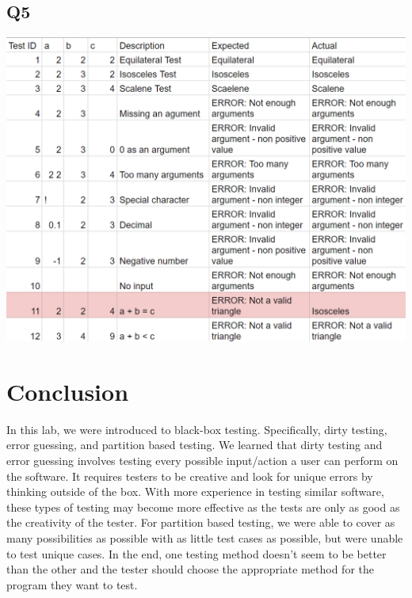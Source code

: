 \documentclass[12pt, letterpaper, titlepage]{article}
\begin{document}
\subsection*{Q5}
\includegraphics[width=15cm]{table2}

\section{Conclusion}
In this lab, we were introduced to black-box testing. Specifically, dirty testing, error guessing, and partition based testing. We learned that dirty testing and error guessing involves testing every possible input/action a user can perform on the software. It requires testers to be creative and look for unique errors by thinking outside of the box. With more experience in testing similar software, these types of testing may become more effective as the tests are only as good as the creativity of the tester. For partition based testing, we were able to cover as many possibilities as possible with as little test cases as possible, but were unable to test unique cases. In the end, one testing method doesn't seem to be better than the other and the tester should choose the appropriate method for the program they want to test.
\end{document}
